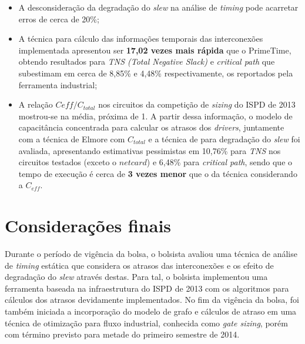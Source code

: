 \documentclass[
	12pt,				%
	openright,			%
	twoside,			%
	a4paper,			%
	english,			%
	french,				%
	spanish,			%
	brazil,				%
	]{abntex2}
\begin{document}
\begin{itemize}
	\item A desconsideração da degradação do \textit{slew} na análise de \textit{timing} pode acarretar erros de cerca de 20\%;
	\item A técnica para cálculo das informações temporais das interconexões implementada apresentou ser \textbf{17,02 vezes mais rápida} que o PrimeTime, obtendo resultados para \textit{TNS (Total Negative Slack)} e \textit{critical path} que subestimam em cerca de 8,85\% e 4,48\% respectivamente, os reportados pela ferramenta industrial;
	\item A relação $C{eff} / C_{total}$ nos circuitos da competição de \textit{sizing} do ISPD de 2013 mostrou-se na média, próxima de 1. A partir dessa informação, o modelo de capacitância concentrada para calcular os atrasos dos \textit{drivers}, juntamente com a técnica de Elmore com $C_{total}$ e a técnica de  para degradação do \textit{slew} foi avaliada, apresentando estimativas pessimistas em 10,76\% para \textit{TNS} nos circuitos testados (exceto o $netcard$) e 6,48\% para \textit{critical path}, sendo que o tempo de execução é cerca de \textbf{3 vezes menor} que o da técnica considerando a $C_{eff}$. 
\end{itemize}


\chapter*[Considerações finais]{Considerações finais}

Durante o período de vigência da bolsa, o bolsista avaliou uma técnica de análise de \textit{timing} estática que considera os atrasos das interconexões e os efeito de degradação do \textit{slew} através destas. Para tal, o bolsista implementou uma ferramenta baseada na infraestrutura do ISPD de 2013 \cite{Contest2013} com os algoritmos para cálculos dos atrasos devidamente implementados. No fim da vigência da bolsa, foi também iniciada a incorporação do modelo de grafo e cálculos de atraso em uma técnica de otimização para fluxo industrial, conhecida como \textit{gate sizing}, porém com término previsto para metade do primeiro semestre de 2014.



\postextual


\end{document}
